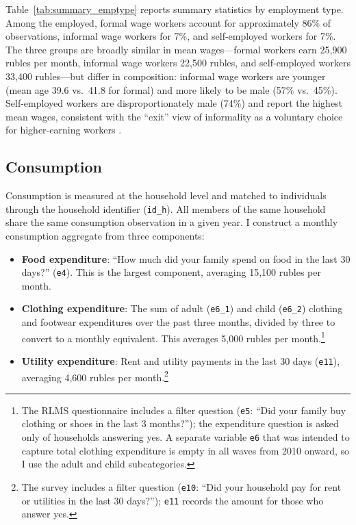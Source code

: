 \documentclass[12pt]{article}
\begin{document}
Table~\ref{tab:summary_emptype} reports summary statistics by employment type. Among the employed, formal wage workers account for approximately 86\% of observations, informal wage workers for 7\%, and self-employed workers for 7\%. The three groups are broadly similar in mean wages---formal workers earn 25,900 rubles per month, informal wage workers 22,500 rubles, and self-employed workers 33,400 rubles---but differ in composition: informal wage workers are younger (mean age 39.6 vs.\ 41.8 for formal) and more likely to be male (57\% vs.\ 45\%). Self-employed workers are disproportionately male (74\%) and report the highest mean wages, consistent with the ``exit'' view of informality as a voluntary choice for higher-earning workers \citep{Maloney2004, Perry2007}.

\subsection{Consumption}

Consumption is measured at the household level and matched to individuals through the household identifier (\texttt{id\_h}). All members of the same household share the same consumption observation in a given year. I construct a monthly consumption aggregate from three components:

\begin{itemize}
\item \textbf{Food expenditure}: ``How much did your family spend on food in the last 30 days?'' (\texttt{e4}). This is the largest component, averaging 15,100 rubles per month.

\item \textbf{Clothing expenditure}: The sum of adult (\texttt{e6\_1}) and child (\texttt{e6\_2}) clothing and footwear expenditures over the past three months, divided by three to convert to a monthly equivalent. This averages 5,000 rubles per month.\footnote{The RLMS questionnaire includes a filter question (\texttt{e5}: ``Did your family buy clothing or shoes in the last 3 months?''); the expenditure question is asked only of households answering yes. A separate variable \texttt{e6} that was intended to capture total clothing expenditure is empty in all waves from 2010 onward, so I use the adult and child subcategories.}

\item \textbf{Utility expenditure}: Rent and utility payments in the last 30 days (\texttt{e11}), averaging 4,600 rubles per month.\footnote{The survey includes a filter question (\texttt{e10}: ``Did your household pay for rent or utilities in the last 30 days?''); \texttt{e11} records the amount for those who answer yes.}
\end{itemize}
\end{document}
